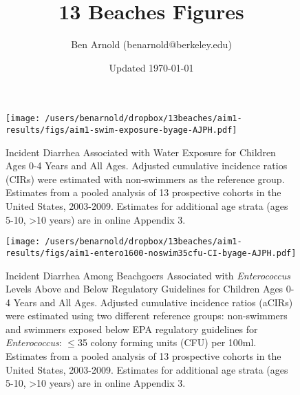 \documentclass[11pt]{article}
\title{13 Beaches Figures}
\author{Ben Arnold (benarnold@berkeley.edu)}
\date{Updated \today}
\begin{document}
\begin{figure}[htbp]
\begin{center}
\texttt{[image: /users/benarnold/dropbox/13beaches/aim1-results/figs/aim1-swim-exposure-byage-AJPH.pdf]}
\begin{minipage}{\textwidth}
\caption{Incident Diarrhea Associated with Water Exposure for Children Ages 0-4 Years and All Ages. Adjusted cumulative incidence ratios (CIRs) were estimated with non-swimmers as the reference group. Estimates from a pooled analysis of 13 prospective cohorts in the United States, 2003-2009. Estimates for additional age strata (ages 5-10, >10 years) are in online Appendix 3.}
\label{fig:swimex}
\end{minipage}
\end{center}
\end{figure}

\begin{figure}[htbp]
\begin{center}
\texttt{[image: /users/benarnold/dropbox/13beaches/aim1-results/figs/aim1-entero1600-noswim35cfu-CI-byage-AJPH.pdf]} \\
\begin{minipage}{\textwidth}
\caption{Incident Diarrhea Among Beachgoers Associated with \textit{Enterococcus} Levels Above and Below Regulatory Guidelines for Children Ages 0-4 Years and All Ages. Adjusted cumulative incidence ratios (aCIRs) were estimated using two different reference groups: non-swimmers and swimmers exposed below EPA regulatory guidelines for \textit{Enterococcus}: $\leq$35 colony forming units (CFU) per 100ml. Estimates from a pooled analysis of 13 prospective cohorts in the United States, 2003-2009. Estimates for additional age strata (ages 5-10, >10 years) are in  online Appendix 3. }
\label{fig:enteroregulatory}
\end{minipage}
\end{center}
\end{figure}
\end{document}
